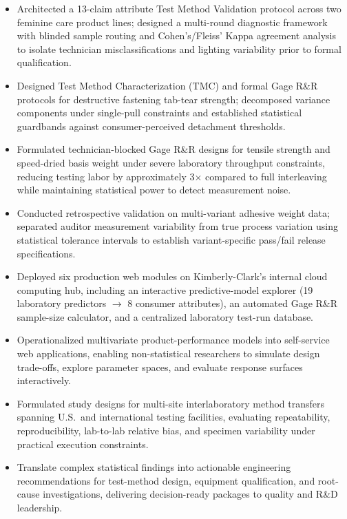 \documentclass[a4paper]{article}
\begin{document}
\begin{itemize}[noitemsep]
  \item Architected a 13-claim attribute Test Method Validation protocol across two feminine care product lines; designed a multi-round diagnostic framework with blinded sample routing and Cohen's/Fleiss' Kappa agreement analysis to isolate technician misclassifications and lighting variability prior to formal qualification.
  \item Designed Test Method Characterization (TMC) and formal Gage R\&R protocols for destructive fastening tab-tear strength; decomposed variance components under single-pull constraints and established statistical guardbands against consumer-perceived detachment thresholds.
  \item Formulated technician-blocked Gage R\&R designs for tensile strength and speed-dried basis weight under severe laboratory throughput constraints, reducing testing labor by approximately 3$\times$ compared to full interleaving while maintaining statistical power to detect measurement noise.
  \item Conducted retrospective validation on multi-variant adhesive weight data; separated auditor measurement variability from true process variation using statistical tolerance intervals to establish variant-specific pass/fail release specifications.
  \item Deployed six production web modules on Kimberly-Clark's internal cloud computing hub, including an interactive predictive-model explorer (19 laboratory predictors $\to$ 8 consumer attributes), an automated Gage R\&R sample-size calculator, and a centralized laboratory test-run database.
  \item Operationalized multivariate product-performance models into self-service web applications, enabling non-statistical researchers to simulate design trade-offs, explore parameter spaces, and evaluate response surfaces interactively.
  \item Formulated study designs for multi-site interlaboratory method transfers spanning U.S.\ and international testing facilities, evaluating repeatability, reproducibility, lab-to-lab relative bias, and specimen variability under practical execution constraints.
  \item Translate complex statistical findings into actionable engineering recommendations for test-method design, equipment qualification, and root-cause investigations, delivering decision-ready packages to quality and R\&D leadership.
\end{itemize}
\end{document}
